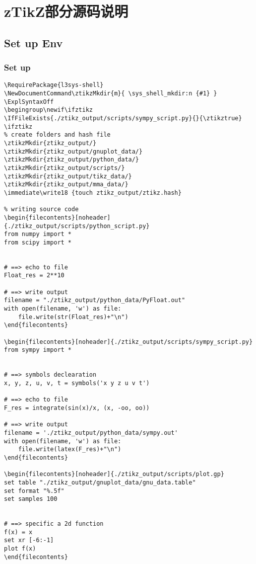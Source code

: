 \chapter{zTikZ部分源码说明}
\section{Set up Env}
\subsection{Set up}
\begin{verbatim}
\RequirePackage{l3sys-shell}
\NewDocumentCommand\ztikzMkdir{m}{ \sys_shell_mkdir:n {#1} }
\ExplSyntaxOff
\begingroup\newif\ifztikz
\IfFileExists{./ztikz_output/scripts/sympy_script.py}{}{\ztikztrue}
\ifztikz
% create folders and hash file
\ztikzMkdir{ztikz_output/}
\ztikzMkdir{ztikz_output/gnuplot_data/}
\ztikzMkdir{ztikz_output/python_data/}
\ztikzMkdir{ztikz_output/scripts/}
\ztikzMkdir{ztikz_output/tikz_data/}
\ztikzMkdir{ztikz_output/mma_data/}
\immediate\write18 {touch ztikz_output/ztikz.hash}

% writing source code
\begin{filecontents}[noheader]{./ztikz_output/scripts/python_script.py}
from numpy import *
from scipy import *


# ==> echo to file
Float_res = 2**10

# ==> write output
filename = "./ztikz_output/python_data/PyFloat.out"
with open(filename, 'w') as file: 
    file.write(str(Float_res)+"\n")
\end{filecontents}

\begin{filecontents}[noheader]{./ztikz_output/scripts/sympy_script.py}
from sympy import *


# ==> symbols declearation
x, y, z, u, v, t = symbols('x y z u v t') 

# ==> echo to file
F_res = integrate(sin(x)/x, (x, -oo, oo))

# ==> write output
filename = './ztikz_output/python_data/sympy.out'
with open(filename, 'w') as file: 
    file.write(latex(F_res)+"\n")
\end{filecontents}

\begin{filecontents}[noheader]{./ztikz_output/scripts/plot.gp}
set table "./ztikz_output/gnuplot_data/gnu_data.table"
set format "%.5f"
set samples 100


# ==> specific a 2d function
f(x) = x
set xr [-6:-1]
plot f(x)
\end{filecontents}


\end{verbatim}
